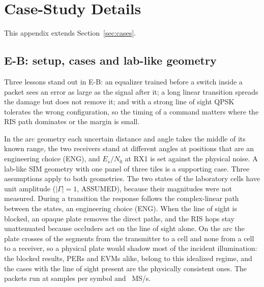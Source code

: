 \section{Case-Study Details}\label{app:cases}

This appendix extends Section~\ref{sec:cases}.

\subsection{E-B: setup, cases and lab-like geometry}
Three lessons stand out in E-B: an equalizer trained before a switch inside a
packet sees an error as large as the signal after it; a long linear transition spreads the
damage but does not remove it; and with a strong line of sight QPSK tolerates the wrong
configuration, so the timing of a command matters where the RIS path dominates or the margin
is small.

In the arc geometry each uncertain distance and angle takes the middle of its
known range, the two receivers stand at different angles at positions that are an engineering
choice (ENG), and $E_s/N_0$ at RX1 is set against the physical noise. A lab-like SIM geometry with one panel of three tiles is a supporting
case. Three assumptions apply to both geometries. The two states of the laboratory cells have
unit amplitude ($|\Gamma|=1$, ASSUMED), because their magnitudes were not measured. During a
transition the response follows the complex-linear path between the states, an engineering
choice (ENG). When the line of sight is blocked, an opaque plate removes the direct paths, and
the RIS hops stay unattenuated because occluders act on the line of sight alone. On the arc
the plate crosses \numEbArcBlockerCrossed{} of the \numEbArcBlockerCells{} segments from the
transmitter to a cell and none from a cell to a receiver, so a physical plate would shadow
most of the incident illumination: the blocked results, PERs and EVMs alike, belong to this
idealized regime, and the cases with the line of sight present are the physically consistent
ones. The packets run at \numEbSps{} samples per symbol and
\numEbRateMsps~MS/s.

